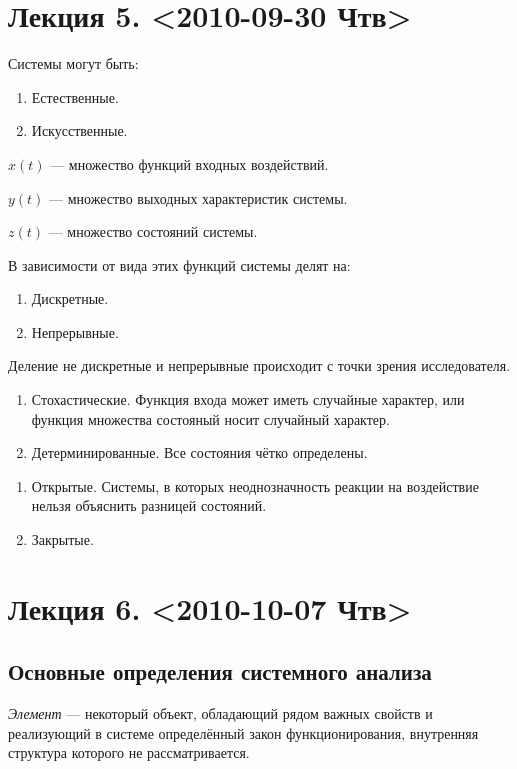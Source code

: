 \documentclass[12pt, russian, oneside, article]{ncc}
\begin{document}
\section{Лекция 5. <2010-09-30 Чтв>}
\label{sec-5}


Системы могут быть:
\begin{enumerate}
\item Естественные.
\item Искусственные.
\end{enumerate}

$x(t)$ --- множество функций входных воздействий.

$y(t)$ --- множество выходных характеристик системы.

$z(t)$ --- множество состояний системы.

В зависимости от вида этих функций системы делят на:
\begin{enumerate}
\item Дискретные.
\item Непрерывные.
\end{enumerate}

Деление не дискретные и непрерывные происходит с точки зрения исследователя.


\begin{enumerate}
\item Стохастические. Функция входа может иметь случайные характер, или функция множества состояный носит случайный характер.
\item Детерминированные. Все состояния чётко определены.
\end{enumerate}
\begin{enumerate}
\item Открытые. Системы, в которых неоднозначность реакции на воздействие нельзя объяснить разницей состояний.
\item Закрытые.
\end{enumerate}
\section{Лекция 6. <2010-10-07 Чтв>}
\label{sec-6}
\subsection{Основные определения системного анализа}
\label{sec-6_1}


\emph{Элемент} --- некоторый объект, обладающий рядом важных свойств и реализующий в системе определённый закон функционирования, внутренняя структура которого не рассматривается.
\end{document}
